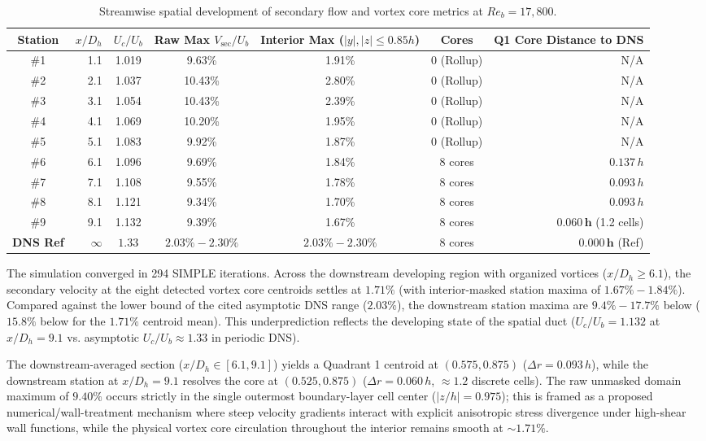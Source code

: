 \documentclass[11pt,a4paper]{article}
\begin{document}
\begin{table}[htbp]
\centering
\small
\caption{Streamwise spatial development of secondary flow and vortex core metrics at $Re_b = 17{,}800$.}
\label{tab:re17800_development}
\vspace{2pt}
\begin{tabularx}{\textwidth}{crccccr}
\toprule
\textbf{Station} & \textbf{$x/D_h$} & \textbf{$U_c/U_b$} & \textbf{Raw Max $V_{\text{sec}}/U_b$} & \textbf{Interior Max ($|y|,|z| \le 0.85h$)} & \textbf{Cores} & \textbf{Q1 Core Distance to DNS} \\
\midrule
\#1 & 1.1 & 1.019 & 9.63\% & 1.91\% & 0 (Rollup) & N/A \\
\#2 & 2.1 & 1.037 & 10.43\% & 2.80\% & 0 (Rollup) & N/A \\
\#3 & 3.1 & 1.054 & 10.43\% & 2.39\% & 0 (Rollup) & N/A \\
\#4 & 4.1 & 1.069 & 10.20\% & 1.95\% & 0 (Rollup) & N/A \\
\#5 & 5.1 & 1.083 & 9.92\% & 1.87\% & 0 (Rollup) & N/A \\
\#6 & 6.1 & 1.096 & 9.69\% & 1.84\% & 8 cores & $0.137\,h$ \\
\#7 & 7.1 & 1.108 & 9.55\% & 1.78\% & 8 cores & $0.093\,h$ \\
\#8 & 8.1 & 1.121 & 9.34\% & 1.70\% & 8 cores & $0.093\,h$ \\
\#9 & 9.1 & 1.132 & 9.39\% & 1.67\% & 8 cores & $\mathbf{0.060\,h}$ (1.2 cells) \\
\midrule
\textbf{DNS Ref} & $\infty$ & $1.33$ & $2.03\% - 2.30\%$ & $\mathbf{2.03\% - 2.30\%}$ & 8 cores & $\mathbf{0.000\,h}$ (Ref) \\
\bottomrule
\end{tabularx}
\end{table}

The simulation converged in 294 SIMPLE iterations. Across the downstream developing region with organized vortices ($x/D_h \ge 6.1$), the secondary velocity at the eight detected vortex core centroids settles at $1.71\%$ (with interior-masked station maxima of $1.67\% - 1.84\%$). Compared against the lower bound of the cited asymptotic DNS range ($2.03\%$), the downstream station maxima are $9.4\% - 17.7\%$ below ($15.8\%$ below for the $1.71\%$ centroid mean). This underprediction reflects the developing state of the spatial duct ($U_c/U_b = 1.132$ at $x/D_h = 9.1$ vs. asymptotic $U_c/U_b \approx 1.33$ in periodic DNS).

The downstream-averaged section ($x/D_h \in [6.1, 9.1]$) yields a Quadrant 1 centroid at $(0.575, 0.875)$ ($\Delta r = 0.093\,h$), while the downstream station at $x/D_h = 9.1$ resolves the core at $(0.525, 0.875)$ ($\Delta r = 0.060\,h$, $\approx 1.2$ discrete cells). The raw unmasked domain maximum of $9.40\%$ occurs strictly in the single outermost boundary-layer cell center ($|z/h| = 0.975$); this is framed as a proposed numerical/wall-treatment mechanism where steep velocity gradients interact with explicit anisotropic stress divergence under high-shear wall functions, while the physical vortex core circulation throughout the interior remains smooth at $\sim 1.71\%$.
\end{document}
